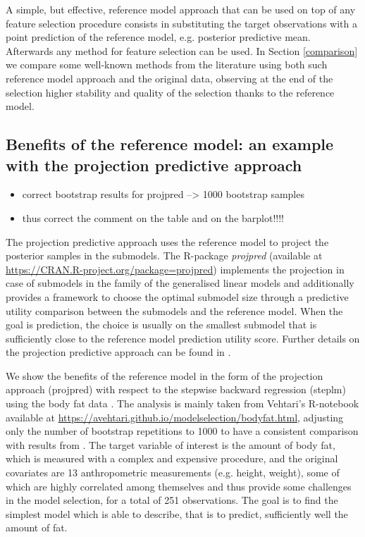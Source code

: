 \documentclass[american,]{article}
\theoremstyle{definition}
\begin{document}
A simple, but effective, reference model approach that can be used on top of any feature selection procedure consists in substituting the target observations with a point prediction of the reference model, e.g. posterior predictive mean. Afterwards any method for feature selection can be used. In Section \ref{comparison} we compare some well-known methods from the literature using both such reference model approach and the original data, observing at the end of the selection higher stability and quality of the selection thanks to the reference model.

\hypertarget{projection}{%
\subsection{Benefits of the reference model: an example with the projection predictive approach}\label{projection}}
\begin{itemize}
\item correct bootstrap results for projpred --> 1000 bootstrap samples 
\item thus correct the comment on the table and on the barplot!!!!
\end{itemize}

The projection predictive approach uses the reference model to project the posterior samples in the submodels. The R-package \textit{projpred} (available at \url{https://CRAN.R-project.org/package=projpred}) implements the projection in case of submodels in the family of the generalised linear models and additionally provides a framework to choose the optimal submodel size through a predictive utility comparison between the submodels and the reference model. When the goal is prediction, the choice is usually on the smallest submodel that is sufficiently close to the reference model prediction utility score. Further details on the projection predictive approach can be found in \cite{paper:projpred}.

We show the benefits of the reference model in the form of the projection approach (projpred) with respect to the stepwise backward regression (steplm) using the body fat data \citep{paper:bodyfat_johnson}. The analysis is mainly taken from Vehtari's R-notebook available at \url{https://avehtari.github.io/modelselection/bodyfat.html}, adjusting only the number of bootstrap repetitions to 1000 to have a consistent comparison with results from \cite{paper:bodyfat}. The target variable of interest is the amount of body fat, which is measured with a complex and expensive procedure, and the original covariates are 13 anthropometric measurements (e.g. height, weight), some of which are highly correlated among themselves and thus provide some challenges in the model selection, for a total of 251 observations. The goal is to find the simplest model which is able to describe, that is to predict, sufficiently well the amount of fat. 
\end{document}
